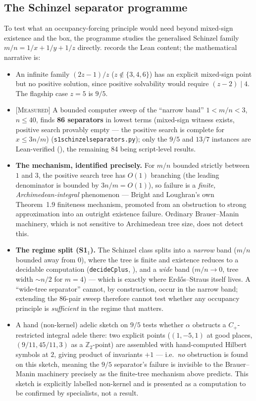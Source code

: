 \documentclass[11pt]{article}
\theoremstyle{plain}
\theoremstyle{definition}
\theoremstyle{remark}
\newcommand{\MEASURED}{\textcolor{claimed}{\textsc{[Measured]}}}
\newcommand{\file}[1]{\texttt{#1}}
\newcommand{\lean}[1]{\texttt{#1}}
\renewcommand{\_}{\textunderscore\allowbreak}
\newcommand{\Z}{\mathbb{Z}}
\begin{document}
\subsection{The Schinzel separator programme}
\label{subsec:schinzel}

To test what an occupancy-forcing principle would need beyond mixed-sign existence and the box,
the programme studies the generalised Schinzel family $m/n=1/x+1/y+1/z$ directly.
 records the Lean content; the mathematical narrative is:
\begin{itemize}[leftmargin=1.4em]
  \item An infinite family $(2z-1)/z$ ($z\notin\{3,4,6\}$) has an explicit mixed-sign point but
        no positive solution, since positive solvability would require $(z-2)\mid4$. The
        flagship case $z=5$ is $9/5$.
  \item \MEASURED{} A bounded computer sweep of the ``narrow band'' $1<m/n<3$, $n\le40$, finds
        \textbf{86 separators} in lowest terms (mixed-sign witness exists, positive search
        provably empty — the positive search is complete for $x\le3n/m$)
        (\file{s1\_schinzel\_separators.py}); only the $9/5$ and $13/7$ instances are Lean-verified
        (), the remaining 84 being script-level results.
  \item \textbf{The mechanism, identified precisely.} For $m/n$ bounded strictly between $1$ and
        $3$, the positive search tree has $O(1)$ branching (the leading denominator is bounded by
        $3n/m=O(1)$), so failure is a \emph{finite, Archimedean-integral} phenomenon — Bright and
        Loughran's own Theorem~1.9 finiteness mechanism, promoted from an obstruction to strong
        approximation into an outright existence failure. Ordinary Brauer--Manin machinery, which
        is not sensitive to Archimedean tree size, does not detect this.
  \item \textbf{The regime split (S1$_1$).} The Schinzel class splits into a \emph{narrow} band
        ($m/n$ bounded away from $0$), where the tree is finite and existence reduces to a
        decidable computation (\lean{decideCplus}, ), and a
        \emph{wide} band ($m/n\to0$, tree width $\sim n/2$ for $m=4$) — which is exactly where
        Erd\H{o}s--Straus itself lives. A ``wide-tree separator'' cannot, by construction, occur
        in the narrow band; extending the 86-pair sweep therefore cannot test whether any
        occupancy principle is \emph{sufficient} in the regime that matters.
  \item A hand (non-kernel) adelic sketch on $9/5$ tests whether $\alpha$ obstructs a
        $C_+$-restricted integral adele there: two explicit points ($(1,-5,1)$ at good places,
        $(9/11,45/11,3)$ as a $\Z_2$-point) are assembled with hand-computed Hilbert symbols at
        $2$, giving product of invariants $+1$ — i.e.\ \emph{no} obstruction is found on this
        sketch, meaning the $9/5$ separator's failure is invisible to the Brauer--Manin
        machinery precisely as the finite-tree mechanism above predicts. This sketch is
        explicitly labelled non-kernel and is presented as a computation to be confirmed by
        specialists, not a result.
\end{itemize}
\end{document}
